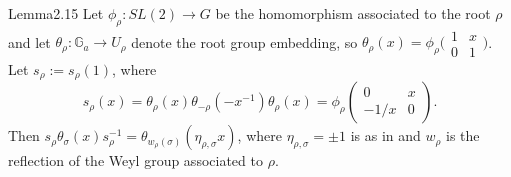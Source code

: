 \documentclass[12pt,letterpaper]{amsart}
\theoremstyle{plain}
\theoremstyle{definition}
\theoremstyle{remark}
\theoremstyle{definition}
\newcommand{\gga}{\mathbb{G}}
\begin{document}
\begin{res}{Lemma}{2.15}\label{res:2.15}
Let $\phi_\rho:SL(2)\rightarrow G$ be the
homomorphism associated to the root
$\rho$ and let $\theta_\rho:\gga_a\rightarrow U_\rho$ denote the root
group embedding, so
$\theta_\rho(x)=\phi_\rho\big(\begin{smallmatrix} 1&x\\ 0&1\end{smallmatrix}\big)$.
Let $s_\rho:=s_\rho(1)$, where
\[
s_\rho(x)=\theta_\rho(x)\theta_{-\rho}(-x^{-1})\theta_\rho(x)
=\phi_\rho\begin{pmatrix} 0&x\\ -1/x&0\end{pmatrix}.
\]
Then
$s_\rho \theta_\sigma (x)s_\rho^{-1}
=\theta_{w_\rho(\sigma)}(\eta_{\rho,\sigma}x)$,
where $\eta_{\rho,\sigma}=\pm1$ is as in \cite[pp.~94--96]{Ca89} and $w_\rho$ is
the reflection of the Weyl group associated to $\rho$.
\end{res}
\end{document}
